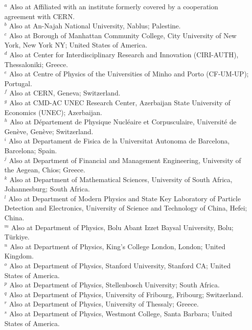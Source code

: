 \documentclass[PAPER, atlasdraft=false, USenglish, cernpreprint]{atlasdoc}
\begin{document}
\begin{flushleft}
$^{a}$ Also at Affiliated with an institute formerly covered by a cooperation agreement with CERN.\\
$^{b}$ Also at An-Najah National University, Nablus; Palestine.\\
$^{c}$ Also at Borough of Manhattan Community College, City University of New York, New York NY; United States of America.\\
$^{d}$ Also at Center for Interdisciplinary Research and Innovation (CIRI-AUTH), Thessaloniki; Greece.\\
$^{e}$ Also at Centre of Physics of the Universities of Minho and Porto (CF-UM-UP); Portugal.\\
$^{f}$ Also at CERN, Geneva; Switzerland.\\
$^{g}$ Also at CMD-AC UNEC Research Center, Azerbaijan State University of Economics (UNEC); Azerbaijan.\\
$^{h}$ Also at D\'epartement de Physique Nucl\'eaire et Corpusculaire, Universit\'e de Gen\`eve, Gen\`eve; Switzerland.\\
$^{i}$ Also at Departament de Fisica de la Universitat Autonoma de Barcelona, Barcelona; Spain.\\
$^{j}$ Also at Department of Financial and Management Engineering, University of the Aegean, Chios; Greece.\\
$^{k}$ Also at Department of Mathematical Sciences, University of South Africa, Johannesburg; South Africa.\\
$^{l}$ Also at Department of Modern Physics and State Key Laboratory of Particle Detection and Electronics, University of Science and Technology of China, Hefei; China.\\
$^{m}$ Also at Department of Physics, Bolu Abant Izzet Baysal University, Bolu; Türkiye.\\
$^{n}$ Also at Department of Physics, King's College London, London; United Kingdom.\\
$^{o}$ Also at Department of Physics, Stanford University, Stanford CA; United States of America.\\
$^{p}$ Also at Department of Physics, Stellenbosch University; South Africa.\\
$^{q}$ Also at Department of Physics, University of Fribourg, Fribourg; Switzerland.\\
$^{r}$ Also at Department of Physics, University of Thessaly; Greece.\\
$^{s}$ Also at Department of Physics, Westmont College, Santa Barbara; United States of America.\\

\end{flushleft}
\end{document}
